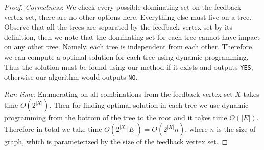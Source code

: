 \documentclass{article}
\begin{document}
\begin{proof}
\noindent \emph{Correctness}: We check every possible dominating set on the feedback vertex set, there are no other options here. Everything else must live on a tree. Observe that all the trees are separated by the feedback vertex set by its definition, then we note that the dominating set for each tree cannot have impact on any other tree. Namely, each tree is independent from each other. Therefore, we can compute a optimal solution for each tree using dynamic programming. Thus the solution must be found using our method if it exists and outputs \texttt{YES}, otherwise our algorithm would outputs \texttt{NO}.



\noindent \emph{Run time}: Enumerating on all combinations from the feedback vertex set \(X\) takes time \(O(2^{|X|})\). Then for finding optimal solution in each tree we use dynamic programming from the bottom of the tree to the root and it takes time \(O(|E|)\). Therefore in total we take time \(O(2^{|X|}|E|)=O(2^{|X|}n)\), where \(n\) is the size of graph, which is parameterized by the size of the feedback vertex set.
\end{proof}
\end{document}
